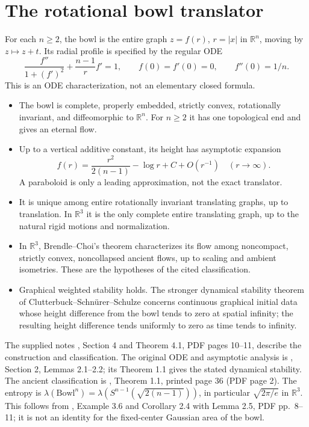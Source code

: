 \chapter{The rotational bowl translator}\label{sec:catalogue-bowl-translator}
\begin{example}\label{ex:catalogue-bowl-translator}
For each $n\geq2$, the bowl is the entire graph $z=f(r)$, $r=|x|$ in $\mathbb R^n$, moving by $z\mapsto z+t$. Its radial profile is specified by the regular ODE
\[
 \frac{f''}{1+(f')^2}+\frac{n-1}{r}f'=1,\qquad
 f(0)=f'(0)=0,\qquad f''(0)=1/n.
\]
This is an ODE characterization, not an elementary closed formula.
\begin{itemize}
\item The bowl is complete, properly embedded, strictly convex, rotationally invariant, and diffeomorphic to $\mathbb R^n$. For $n\geq2$ it has one topological end and gives an eternal flow.
\item Up to a vertical additive constant, its height has asymptotic expansion
\[
 f(r)=\frac{r^2}{2(n-1)}-\log r+C+O(r^{-1})\quad(r\to\infty).
\]
A paraboloid is only a leading approximation, not the exact translator.
\item It is unique among entire rotationally invariant translating graphs, up to translation. In $\mathbb R^3$ it is the only complete entire translating graph, up to the natural rigid motions and normalization.
\item In $\mathbb R^3$, Brendle--Choi's theorem characterizes its flow among noncompact, strictly convex, noncollapsed ancient flows, up to scaling and ambient isometries. These are the hypotheses of the cited classification.
\item Graphical weighted stability holds. The stronger dynamical stability theorem of Clutterbuck--Schn\"urer--Schulze concerns continuous graphical initial data whose height difference from the bowl tends to zero at spatial infinity; the resulting height difference tends uniformly to zero as time tends to infinity.
\end{itemize}
The supplied notes \cite{CatHIMWNotes19}, Section 4 and Theorem 4.1, PDF pages 10--11, describe the construction and classification. The original ODE and asymptotic analysis is \cite{CSS07}, Section 2, Lemmas 2.1--2.2; its Theorem 1.1 gives the stated dynamical stability. The ancient classification is \cite{CatBrendleChoi19}, Theorem 1.1, printed page 36 (PDF page 2). The entropy is $\lambda(\mathrm{Bowl}^n)=\lambda(S^{n-1}(\sqrt{2(n-1)}))$, in particular $\sqrt{2\pi/e}$ in $\mathbb R^3$. This follows from \cite{CatSunWang2025}, Example 3.6 and Corollary 2.4 with Lemma 2.5, PDF pp.~8--11; it is not an identity for the fixed-center Gaussian area of the bowl.
\end{example}


